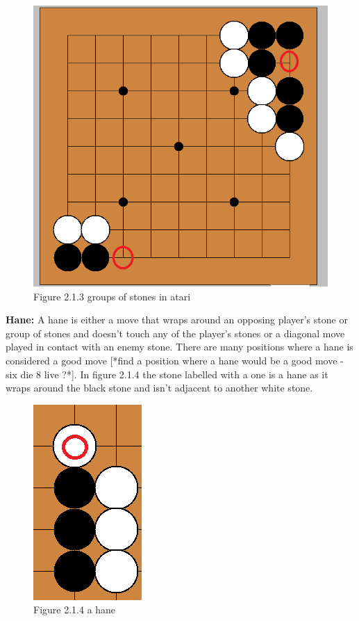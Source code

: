 \documentclass{l3proj}
\begin{document}
\begin{figure}[H]
\centering
\includegraphics[scale=0.5]{Images/groupsofstonesinatari.png}
\caption{Figure 2.1.3 groups of stones in atari}
\end{figure}

\textbf{Hane:} A hane is either a move that wraps around an opposing player's stone or group of stones and doesn’t touch any of the player’s stones or a diagonal move played in contact with an enemy stone. There are many positions where a hane is considered a good move [*find a position where a hane would be a good move - six die 8 live ?*]. In figure 2.1.4 the stone labelled with a one is a hane as it wraps around the black stone and isn’t adjacent to another white stone.

\begin{figure}[H]
\centering
\includegraphics[scale=0.5]{Images/ahane.png}
\caption{Figure 2.1.4 a hane}
\end{figure}
\end{document}
